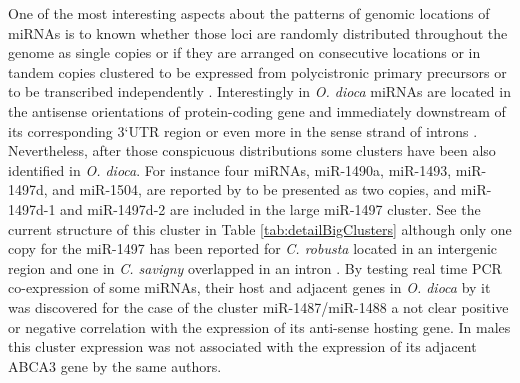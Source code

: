 \documentclass[graybox]{svmult}
\begin{document}
One of the most interesting aspects about the patterns of genomic locations
of miRNAs is to known whether those loci are randomly distributed
throughout the genome as single copies or if they are arranged on
consecutive locations or in tandem copies clustered to be expressed from
polycistronic primary precursors or to be transcribed independently
\cite{Tanzer:10a}. Interestingly in \textit{O. dioca} miRNAs are located in
the antisense orientations of protein-coding gene and immediately
downstream of its corresponding 3`UTR region or even more in the sense
strand of introns \cite{Fu:08}. Nevertheless, after those conspicuous
distributions some clusters have been also identified in
\textit{O. dioca}. For instance four miRNAs, miR-1490a, miR-1493,
miR-1497d, and miR-1504, are reported by \cite{Fu:08} to be presented as
two copies, and miR-1497d-1 and miR-1497d-2 are included in the large
miR-1497 cluster. See the current structure of this cluster in Table
\ref{tab:detailBigClusters} although only one copy for the miR-1497 has
been reported for \textit{C. robusta} located in an intergenic region
\cite{Fu:08, Hendrix2010} and one in \textit{C. savigny} overlapped in an
intron \cite{Fu:08}. By testing real time PCR co-expression of some miRNAs,
their host and adjacent genes in \textit{O.  dioca} by \cite{Fu:08} it was
discovered for the case of the cluster miR-1487/miR-1488 a not clear
positive or negative correlation with the expression of its anti-sense
hosting gene. In males this cluster expression was not associated with the
expression of its adjacent ABCA3 gene by the same authors.
\end{document}
